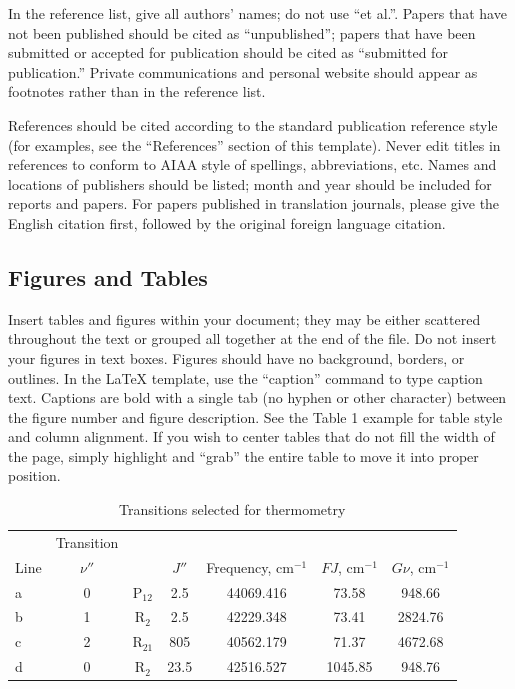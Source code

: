 \documentclass[journal ]{new-aiaa}
\begin{document}
In the reference list, give all authors' names; do not use ``et al.''. Papers that have not been published should be cited as ``unpublished''; papers that have been submitted or accepted for publication should be cited as ``submitted for publication.'' Private communications and personal website should appear as footnotes rather than in the reference list.

References should be cited according to the standard publication reference style (for examples, see the ``References'' section of this template). Never edit titles in references to conform to AIAA style of spellings, abbreviations, etc. Names and locations of publishers should be listed; month and year should be included for reports and papers. For papers published in translation journals, please give the English citation first, followed by the original foreign language citation.

\subsection{Figures and Tables}
Insert tables and figures within your document; they may be either scattered throughout the text or grouped all together at the end of the file. Do not insert your figures in text boxes. Figures should have no background, borders, or outlines. In the \LaTeX{} template, use the ``caption'' command to type caption text. Captions are bold with a single tab (no hyphen or other character) between the figure number and figure description. See the Table 1 example for table style and column alignment. If you wish to center tables that do not fill the width of the page, simply highlight and “grab” the entire table to move it into proper position.


\begin{table}[hbt!]
\caption{\label{tab:table1} Transitions selected for thermometry}
\centering
\begin{tabular}{lcccccc}
\hline
& Transition& & \multicolumn{2}{c}{}\\\cline{2-2}
Line& $\nu''$& & $J'' $& Frequency, cm$^{-1}$& $FJ$, cm$^{-1}$& $G\nu $, cm$^{-1}$\\\hline
a& 0& P$_{12}$& 2.5& 44069.416& 73.58& 948.66\\
b& 1& R$_{2}$& 2.5& 42229.348& 73.41& 2824.76\\
c& 2& R$_{21}$& 805& 40562.179& 71.37& 4672.68\\
d& 0& R$_{2}$& 23.5& 42516.527& 1045.85& 948.76\\
\hline
\end{tabular}
\end{table}
\end{document}
